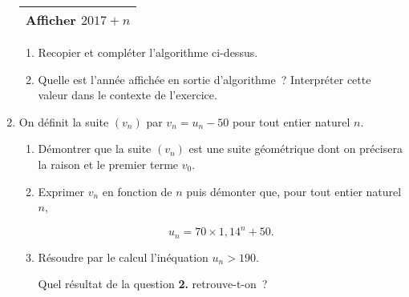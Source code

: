\begin{enumerate}
\begin{center}
\begin{extern}
\begin{tabularx}{0.3\linewidth}{|X|}
                    Afficher $2017+n$\\
                    \hline
               \end{tabularx}
          \end{extern}
     \end{center}
     \begin{enumerate}[label=\alph*.]
          \item Recopier et compléter l'algorithme ci-dessus.
          \item Quelle est l'année affichée en sortie d'algorithme~? Interpréter cette valeur dans le contexte de l'exercice.
     \end{enumerate}
     \item On définit la suite $(v_n)$ par $v_n=u_n-50$ pour tout entier naturel $n$.
     \begin{enumerate}[label=\alph*.]
          \item Démontrer que la suite $(v_n)$ est une suite géométrique dont on précisera la raison et le premier terme $v_0$.
          \item Exprimer $v_n$ en fonction de $n$ puis démonter que, pour tout entier naturel $n$,
          \par
          \[u_n=70\times 1,14^n+50.\]
          \par
          \item Résoudre par le calcul l'inéquation $u_n>190$.
          \par
          Quel résultat de la question \textbf{2.} retrouve-t-on~?
     \end{enumerate}
\end{enumerate}
